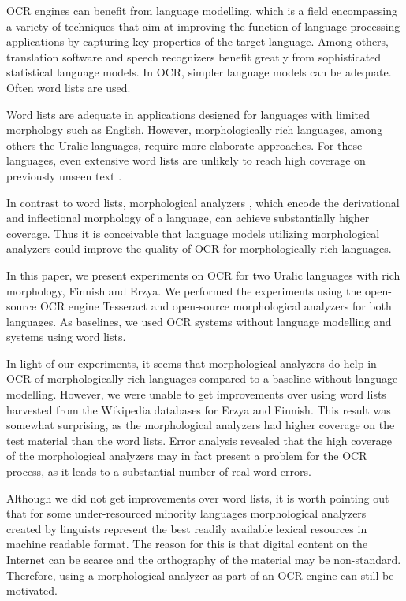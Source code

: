 \documentclass[b5paper]{article}
\begin{document}
OCR engines can benefit from language modelling, which is a field
encompassing a variety of techniques that aim at improving the
function of language processing applications by capturing key
properties of the target language. Among others, translation software
and speech recognizers benefit greatly from sophisticated statistical
language models. In OCR, simpler language models can be
adequate. Often word lists are used.

Word lists are adequate in applications designed for languages with
limited morphology such as English. However, morphologically rich
languages, among others the Uralic languages, require more elaborate
approaches. For these languages, even extensive word lists are
unlikely to reach high coverage on previously unseen text \cite{creutz07}.

In contrast to word lists, morphological analyzers
\cite{koskenniemi83}, which encode the derivational and inflectional
morphology of a language, can achieve substantially higher
coverage. Thus it is conceivable that language models utilizing
morphological analyzers could improve the quality of OCR for
morphologically rich languages.

In this paper, we present experiments on OCR for two Uralic languages
with rich morphology, Finnish and Erzya. We performed the experiments
using the open-source OCR engine Tesseract \cite{smith07} and
open-source morphological analyzers for both languages. As baselines, we used OCR
systems without language modelling and systems using word lists.

In light of our experiments, it seems that morphological analyzers do
help in OCR of morphologically rich languages compared to a baseline
without language modelling. However, we were unable to get improvements
over using word lists harvested from the Wikipedia databases for Erzya
and Finnish. This result was somewhat surprising, as the morphological
analyzers had higher coverage on the test material than the word
lists. Error analysis revealed that the high coverage of the
morphological analyzers may in fact present a problem for the OCR
process, as it leads to a substantial number of real word errors.

Although we did not get improvements over word lists, it is worth
pointing out that for some under-resourced minority languages
morphological analyzers created by linguists represent the best
readily available lexical resources in machine readable format. The
reason for this is that digital content on the Internet can be scarce
and the orthography of the material may be non-standard. Therefore,
using a morphological analyzer as part of an OCR engine can still be
motivated.
\end{document}
